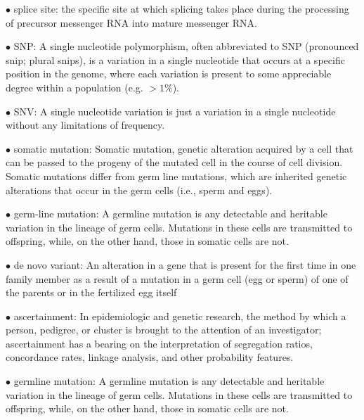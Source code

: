 \documentclass{article}
\begin{document}
\vspace{0.1in}
$\bullet$ splice site:
the specific site at which splicing takes place during the processing of precursor messenger RNA into mature messenger RNA.


\vspace{0.1in}
$\bullet$ SNP:
A single nucleotide polymorphism, often abbreviated to SNP (pronounced snip; plural snips), is a variation in a single nucleotide that occurs at a specific position in the genome, where each variation is present to some appreciable degree within a population (e.g. $ >1\% $).


\vspace{0.1in}
$\bullet$ SNV:
A single nucleotide variation is just a variation in a single nucleotide without any limitations of frequency. 


\vspace{0.1in}
$\bullet$ somatic mutation:
Somatic mutation, genetic alteration acquired by a cell that can be passed to the progeny of the mutated cell in the course of cell division. Somatic mutations differ from germ line mutations, which are inherited genetic alterations that occur in the germ cells (i.e., sperm and eggs).


\vspace{0.1in}
$\bullet$ germ-line mutation:
A germline mutation is any detectable and heritable variation in the lineage of germ cells. Mutations in these cells are transmitted to offspring, while, on the other hand, those in somatic cells are not.


\vspace{0.1in}
$\bullet$ de novo variant:
An alteration in a gene that is present for the first time in one family member as a result of a mutation in a germ cell (egg or sperm) of one of the parents or in the fertilized egg itself


\vspace{0.1in}
$\bullet$ ascertainment:
In epidemiologic and genetic research, the method by which a person, pedigree, or cluster is brought to the attention of an investigator; ascertainment has a bearing on the interpretation of segregation ratios, concordance rates, linkage analysis, and other probability features.


\vspace{0.1in}
$\bullet$ germline mutation:
A germline mutation is any detectable and heritable variation in the lineage of germ cells. Mutations in these cells are transmitted to offspring, while, on the other hand, those in somatic cells are not.
\end{document}
